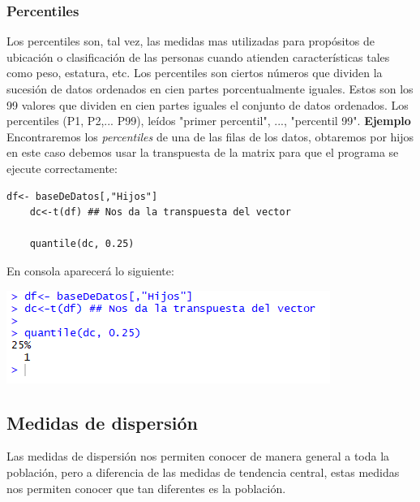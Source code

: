 \documentclass[12pt,hidelinks]{article}
\begin{document}
	\subsubsection{Percentiles}
	Los percentiles son, tal vez, las medidas mas utilizadas para propósitos de ubicación o clasificación de las personas cuando atienden características tales como peso, estatura, etc. Los percentiles son ciertos números que dividen la sucesión de datos ordenados en cien partes porcentualmente iguales. Estos son los 99 valores que dividen en cien partes iguales el conjunto de datos ordenados. Los percentiles (P1, P2,... P99), leídos "primer percentil", ..., "percentil 99". \textbf{Ejemplo} Encontraremos los \textit{percentiles} de una de las filas de los datos, obtaremos por hijos en este caso debemos usar la transpuesta de la matrix para que el programa se ejecute correctamente:
	\begin{lstlisting}[frame=single]
	df<- baseDeDatos[,"Hijos"]
	dc<-t(df) ## Nos da la transpuesta del vector
	
	quantile(dc, 0.25)
	\end{lstlisting}
	En consola aparecerá lo siguiente:
	\begin{center}
		\includegraphics[]{Percentiles.PNG}
	\end{center}
	\subsection{Medidas de dispersión} Las medidas de dispersión nos permiten conocer de manera general a toda la población, pero a diferencia de las medidas de tendencia central, estas medidas nos permiten conocer que tan diferentes es la población.
\end{document}

